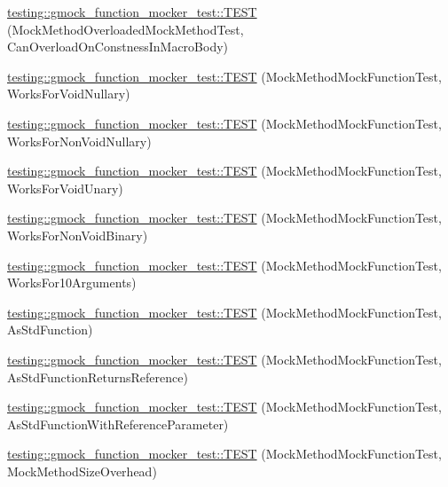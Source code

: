 \begin{DoxyCompactItemize}
\item 
\mbox{\hyperlink{namespacetesting_1_1gmock__function__mocker__test_ad88b0b208d03f3e5dee3a164ce33e39c}{testing\+::gmock\+\_\+function\+\_\+mocker\+\_\+test\+::\+T\+E\+ST}} (Mock\+Method\+Overloaded\+Mock\+Method\+Test, Can\+Overload\+On\+Constness\+In\+Macro\+Body)
\item 
\mbox{\hyperlink{namespacetesting_1_1gmock__function__mocker__test_ad889805da4cce67f2206590b750b27a2}{testing\+::gmock\+\_\+function\+\_\+mocker\+\_\+test\+::\+T\+E\+ST}} (Mock\+Method\+Mock\+Function\+Test, Works\+For\+Void\+Nullary)
\item 
\mbox{\hyperlink{namespacetesting_1_1gmock__function__mocker__test_ae2b01f0da84371fde518da4066b6a172}{testing\+::gmock\+\_\+function\+\_\+mocker\+\_\+test\+::\+T\+E\+ST}} (Mock\+Method\+Mock\+Function\+Test, Works\+For\+Non\+Void\+Nullary)
\item 
\mbox{\hyperlink{namespacetesting_1_1gmock__function__mocker__test_a2f1e932fb15621747f47d617efbe395e}{testing\+::gmock\+\_\+function\+\_\+mocker\+\_\+test\+::\+T\+E\+ST}} (Mock\+Method\+Mock\+Function\+Test, Works\+For\+Void\+Unary)
\item 
\mbox{\hyperlink{namespacetesting_1_1gmock__function__mocker__test_a31ed39f17667619d800693a7eb90682e}{testing\+::gmock\+\_\+function\+\_\+mocker\+\_\+test\+::\+T\+E\+ST}} (Mock\+Method\+Mock\+Function\+Test, Works\+For\+Non\+Void\+Binary)
\item 
\mbox{\hyperlink{namespacetesting_1_1gmock__function__mocker__test_a3396573237c21c4c397152bcfbb3beff}{testing\+::gmock\+\_\+function\+\_\+mocker\+\_\+test\+::\+T\+E\+ST}} (Mock\+Method\+Mock\+Function\+Test, Works\+For10\+Arguments)
\item 
\mbox{\hyperlink{namespacetesting_1_1gmock__function__mocker__test_aa50eb1403be35a710eb62edf606ee2a1}{testing\+::gmock\+\_\+function\+\_\+mocker\+\_\+test\+::\+T\+E\+ST}} (Mock\+Method\+Mock\+Function\+Test, As\+Std\+Function)
\item 
\mbox{\hyperlink{namespacetesting_1_1gmock__function__mocker__test_adc6133bd5a20d1a4690f626d09619cb2}{testing\+::gmock\+\_\+function\+\_\+mocker\+\_\+test\+::\+T\+E\+ST}} (Mock\+Method\+Mock\+Function\+Test, As\+Std\+Function\+Returns\+Reference)
\item 
\mbox{\hyperlink{namespacetesting_1_1gmock__function__mocker__test_af727b49c865283e3ef0209fac721cfd7}{testing\+::gmock\+\_\+function\+\_\+mocker\+\_\+test\+::\+T\+E\+ST}} (Mock\+Method\+Mock\+Function\+Test, As\+Std\+Function\+With\+Reference\+Parameter)
\item 
\mbox{\hyperlink{namespacetesting_1_1gmock__function__mocker__test_a5c28161d4686a85b0e5bf4a1f2b961f6}{testing\+::gmock\+\_\+function\+\_\+mocker\+\_\+test\+::\+T\+E\+ST}} (Mock\+Method\+Mock\+Function\+Test, Mock\+Method\+Size\+Overhead)
\end{DoxyCompactItemize}


